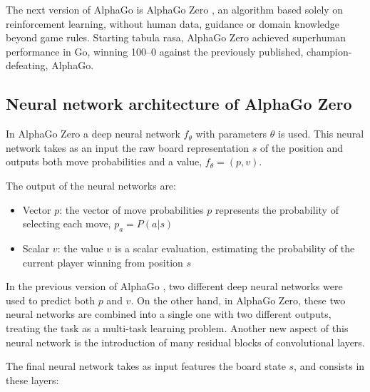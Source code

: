 \documentclass{article}
\begin{document}
The next version of AlphaGo is AlphaGo Zero \cite{silver2017mastering}, an algorithm based solely on reinforcement learning, without human data, guidance or domain knowledge beyond game rules. Starting tabula rasa, AlphaGo Zero achieved superhuman performance in Go, winning 100–0 against the previously published, champion-defeating, AlphaGo.

\subsection{Neural network architecture  of AlphaGo Zero} \label{nn-arch}
In AlphaGo Zero a deep neural network $f_\theta$ with parameters $\theta$ is used. This neural network takes as an input the raw board representation $s$ of the position and outputs both move probabilities and a value, $f_\theta = (p,v)$. 

The output of the neural networks are:
\begin{itemize}
	\item Vector $p$: the vector of move probabilities $p$ represents the probability of selecting each move, $p_a = P(a | s)$
	\item Scalar $v$: the value $v$ is a scalar evaluation, estimating the probability of the current player winning from position $s$
\end{itemize}
In the previous version of AlphaGo \cite{Silver_2016}, two different deep neural networks were used to predict both $p$ and $v$. On the other hand, in AlphaGo Zero, these two neural networks are combined into a single one with two different outputs, treating the task as a multi-task learning problem. Another new aspect of this neural network is the introduction of many residual blocks of convolutional layers.

The final neural network takes as input features the board state $s$,  and consists in these layers:
\end{document}
